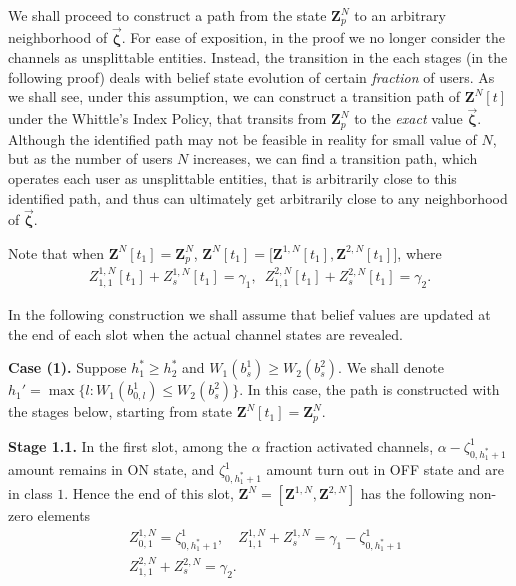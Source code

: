 \documentclass[11pt,twocolumn]{IEEEtran}
\begin{document}
We shall proceed to construct a path from the state $\bm Z^N_p$ to an arbitrary neighborhood of  $\vec{\bm \zeta}$. For ease of exposition, in the proof we no longer consider the channels as unsplittable entities. Instead, the transition in the each stages (in the following proof) deals with belief state evolution of certain \emph{fraction} of users. As we shall see, under this assumption, we can construct a transition path of $\bm Z^N[t]$ under the Whittle's Index Policy, that transits from $\bm Z^N_p$ to the \emph{exact} value $\vec{\bm \zeta}$. Although the identified path may not be feasible in reality for small value of $N$, but as the number of users $N$ increases, we can find a transition path, which operates each user as unsplittable entities, that is arbitrarily close to this identified path, and thus can ultimately get arbitrarily close to any neighborhood of $\vec{\bm \zeta}$.

Note that when $\bm Z^N[t_1]=\bm Z^N_p$, $\bm Z^N[t_1]=\big[\bm Z^{1,N}[t_1], \bm Z^{2,N}[t_1]\big]$, where
\begin{align}
Z^{1,N}_{1,1}[t_1]{+} Z^{1,N}_{s}[t_1]=\gamma_1, \hspace{6pt} Z^{2,N}_{1,1}[t_1]{+}Z^{2,N}_{s}[t_1]=\gamma_2. \nonumber
\end{align}

In the following construction we shall assume that belief values are updated at the end of each slot when the actual channel states are revealed.
\vspace{6pt}

\noindent \textbf{Case (1). }Suppose $h^*_1 \geq h^*_2$ and $W_1(b^1_s)\geq W_2(b^2_s)$. We shall denote $h_1'=\max\{l: W_1(b^1_{0,l}) \leq  W_2(b^2_s)\}$. In this case,
the path is constructed with the stages below, starting from state $\bm Z^N[t_1]=\bm Z^N_p$.
\vspace{7pt}

\noindent\textbf{Stage 1.1.} In the first slot, among the $\alpha$ fraction activated channels, $\alpha-\zeta^1_{0,h_1^*+1}$ amount remains in ON state, and $\zeta^1_{0,h_1^*+1}$ amount turn out in OFF state and are in class $1$. Hence the end of this slot, $\bm Z^N=[\bm Z^{1,N}, \bm Z^{2,N}]$ has the following non-zero elements
\begin{align}
&Z^{1,N}_{0,1}=\zeta^1_{0,h_1^*+1}, \quad Z^{1,N}_{1,1}+ Z^{1,N}_{s}=\gamma_1-\zeta^1_{0,h_1^*+1}\nonumber\\
&Z^{2,N}_{1,1}+Z^{2,N}_{s}=\gamma_2. \nonumber
\end{align}
\end{document}
